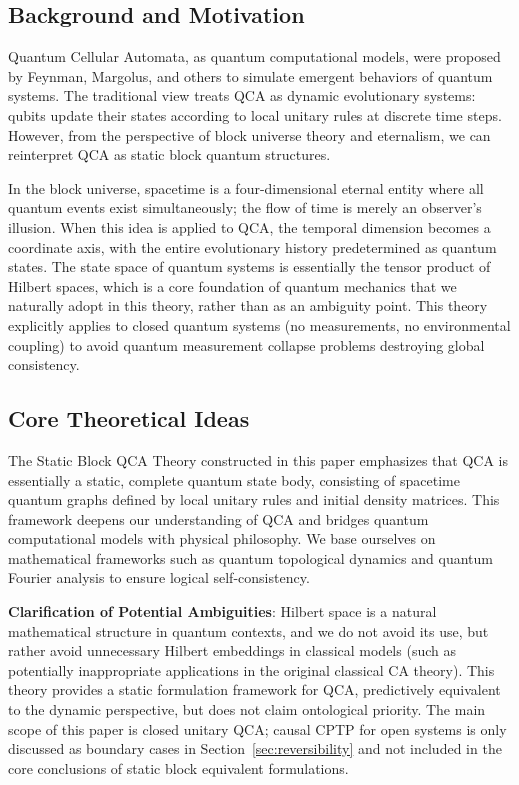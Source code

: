 \documentclass[11pt]{article}
\theoremstyle{definition}
\theoremstyle{remark}
\begin{document}
\subsection{Background and Motivation}

Quantum Cellular Automata, as quantum computational models, were proposed by Feynman, Margolus, and others to simulate emergent behaviors of quantum systems. The traditional view treats QCA as dynamic evolutionary systems: qubits update their states according to local unitary rules at discrete time steps. However, from the perspective of block universe theory and eternalism, we can reinterpret QCA as static block quantum structures.

In the block universe, spacetime is a four-dimensional eternal entity where all quantum events exist simultaneously; the flow of time is merely an observer's illusion. When this idea is applied to QCA, the temporal dimension becomes a coordinate axis, with the entire evolutionary history predetermined as quantum states. The state space of quantum systems is essentially the tensor product of Hilbert spaces, which is a core foundation of quantum mechanics that we naturally adopt in this theory, rather than as an ambiguity point. This theory explicitly applies to closed quantum systems (no measurements, no environmental coupling) to avoid quantum measurement collapse problems destroying global consistency.

\subsection{Core Theoretical Ideas}

The Static Block QCA Theory constructed in this paper emphasizes that QCA is essentially a static, complete quantum state body, consisting of spacetime quantum graphs defined by local unitary rules and initial density matrices. This framework deepens our understanding of QCA and bridges quantum computational models with physical philosophy. We base ourselves on mathematical frameworks such as quantum topological dynamics and quantum Fourier analysis to ensure logical self-consistency.

\textbf{Clarification of Potential Ambiguities}: Hilbert space is a natural mathematical structure in quantum contexts, and we do not avoid its use, but rather avoid unnecessary Hilbert embeddings in classical models (such as potentially inappropriate applications in the original classical CA theory). This theory provides a static formulation framework for QCA, predictively equivalent to the dynamic perspective, but does not claim ontological priority. The main scope of this paper is closed unitary QCA; causal CPTP for open systems is only discussed as boundary cases in Section~\ref{sec:reversibility} and not included in the core conclusions of static block equivalent formulations.
\end{document}
